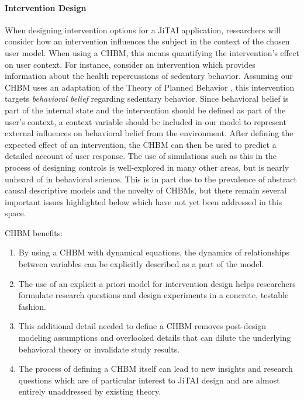 \documentclass[runningheads,a4paper]{llncs}
\begin{document}
\paragraph{Intervention Design}
When designing intervention options for a JiTAI application, researchers will consider how an intervention influences the subject in the context of the chosen user model.
When using a CHBM, this means quantifying the intervention's effect on user context.
For instance, consider an intervention which provides information about the health repercussions of sedentary behavior.
Assuming our CHBM uses an adaptation of the Theory of Planned Behavior \cite{Ajzen1991theory}, this intervention targets \emph{behavioral belief} regarding sedentary behavior.
Since behavioral belief is part of the internal state and the intervention should be defined as part of the user's context, a context variable should be included in our model to represent external influences on behavioral belief from the environment.
After defining the expected effect of an intervention, the CHBM can then be used to predict a detailed account of user response.
The use of simulations such as this in the process of designing controls is well-explored in many other areas, but is nearly unheard of in behavioral science.
This is in part due to the prevalence of abstract causal descriptive models and the novelty of CHBMs, but there remain several important issues highlighted below which have not yet been addressed in this space.

CHBM benefits: 
\begin{enumerate}
    \item By using a CHBM with dynamical equations, the dynamics of relationships between variables can be explicitly described as a part of the model.
    \item The use of an explicit a priori model for intervention design helps researchers formulate research questions and design experiments in a concrete, testable fashion.
    \item This additional detail needed to define a CHBM removes post-design modeling assumptions and overlooked details that can dilute the underlying behavioral theory or invalidate study results.
    \item The process of defining a CHBM itself can lead to new insights and research questions which are of particular interest to JiTAI design and are almost entirely unaddressed by existing theory.
\end{enumerate}
\end{document}
